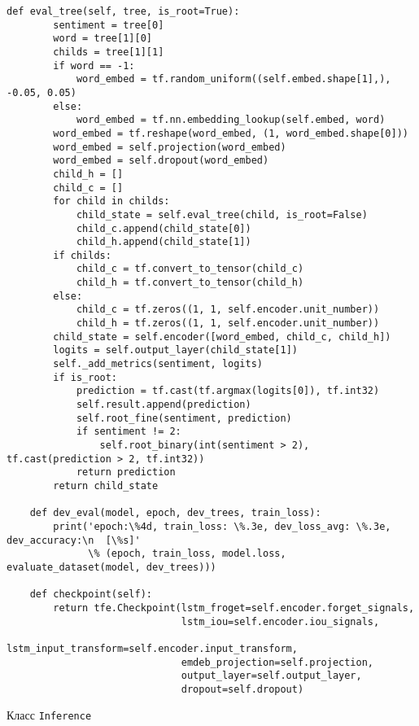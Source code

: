 \begin{lstlisting}[style=app]
    def eval_tree(self, tree, is_root=True):
        sentiment = tree[0]
        word = tree[1][0]
        childs = tree[1][1]
        if word == -1:
            word_embed = tf.random_uniform((self.embed.shape[1],), -0.05, 0.05)
        else:
            word_embed = tf.nn.embedding_lookup(self.embed, word)
        word_embed = tf.reshape(word_embed, (1, word_embed.shape[0]))
        word_embed = self.projection(word_embed)
        word_embed = self.dropout(word_embed)
        child_h = []
        child_c = []
        for child in childs:
            child_state = self.eval_tree(child, is_root=False)
            child_c.append(child_state[0])
            child_h.append(child_state[1])
        if childs:
            child_c = tf.convert_to_tensor(child_c)
            child_h = tf.convert_to_tensor(child_h)
        else:
            child_c = tf.zeros((1, 1, self.encoder.unit_number))
            child_h = tf.zeros((1, 1, self.encoder.unit_number))
        child_state = self.encoder([word_embed, child_c, child_h])
        logits = self.output_layer(child_state[1])
        self._add_metrics(sentiment, logits)
        if is_root:
            prediction = tf.cast(tf.argmax(logits[0]), tf.int32)
            self.result.append(prediction)
            self.root_fine(sentiment, prediction)
            if sentiment != 2:
                self.root_binary(int(sentiment > 2), tf.cast(prediction > 2, tf.int32))
            return prediction
        return child_state

    def dev_eval(model, epoch, dev_trees, train_loss):
        print('epoch:\%4d, train_loss: \%.3e, dev_loss_avg: \%.3e, dev_accuracy:\n  [\%s]'
              \% (epoch, train_loss, model.loss, evaluate_dataset(model, dev_trees)))

    def checkpoint(self):
        return tfe.Checkpoint(lstm_froget=self.encoder.forget_signals,
                              lstm_iou=self.encoder.iou_signals,
                              lstm_input_transform=self.encoder.input_transform,
                              emdeb_projection=self.projection,
                              output_layer=self.output_layer,
                              dropout=self.dropout)

\end{lstlisting}

\begin{center}Класс \texttt{Inference}\end{center}

